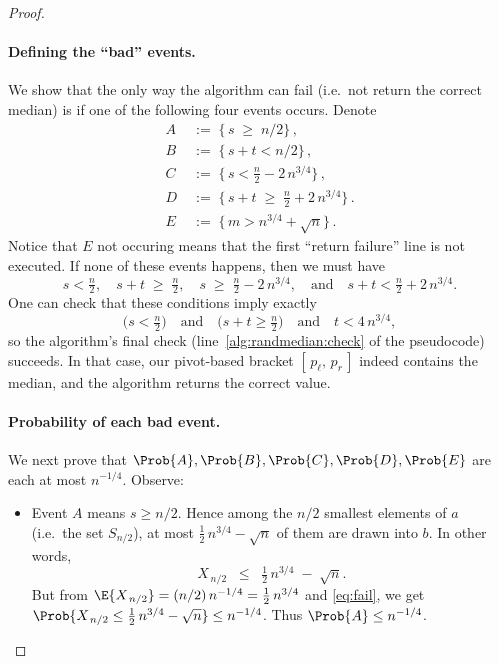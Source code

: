 \begin{proof}
    \paragraph{Defining the “bad” events.}
    We show that the only way the algorithm can fail (i.e.\ not return the correct median) is if one of the following four events occurs. Denote
    \begin{align*}
    A \;&:=\; \{\, s \;\ge\; n/2 \}\,,
    \\
    B \;&:=\; \{\, s + t < n/2 \}\,,
    \\
    C \;&:=\; \{\, s < \tfrac{n}{2} - 2\,n^{3/4} \}\,,
    \\
    D \;&:=\; \{\, s + t \;\ge\; \tfrac{n}{2} + 2\,n^{3/4} \}\,.
    \\
    E \;&:=\; \{\, m > n^{3/4} + \sqrt{n} \}\,.
    \end{align*}
    Notice that $E$ not occuring means that the first ``return failure'' line is not executed. If none of these events happens, then we must have
    \[
    s < \tfrac{n}{2}, 
    \quad
    s + t \;\ge\; \tfrac{n}{2},
    \quad
    s \;\ge\; \tfrac{n}{2} - 2\,n^{3/4},
    \quad
    \text{and}
    \quad
    s + t < \tfrac{n}{2} + 2\,n^{3/4}.
    \]
    One can check that these conditions imply exactly
    \[
    \bigl(s < \tfrac{n}{2}\bigr)
    \quad\text{and}\quad
    \bigl(s + t \ge \tfrac{n}{2}\bigr)
    \quad\text{and}\quad
    t < 4\,n^{3/4},
    \]
    so the algorithm’s final check (line~\ref{alg:randmedian:check} of the pseudocode) succeeds. In that case, our pivot-based bracket \([\,p_\ell,\,p_r\,]\) indeed contains the median, and the algorithm returns the correct value.
    
    \paragraph{Probability of each bad event.}
    We next prove that \(\Prob{A},\Prob{B},\Prob{C},\Prob{D},\Prob{E}\) are each at most \(n^{-1/4}\). Observe:
    \begin{itemize}
    \item Event \(A\) means \(s \ge n/2\). Hence among the \(n/2\) smallest elements of \(a\) (i.e.\ the set \(S_{n/2}\)), at most \(\tfrac12\,n^{3/4} - \sqrt{n}\) of them are drawn into \(b\). In other words,
    \[
    X_{\,n/2} \;\;\le\;\; \tfrac12\,n^{3/4} \;-\; \sqrt{n}.
    \]
    But from \(\E{X_{\,n/2}} = (n/2)\,n^{-1/4} = \tfrac12\,n^{3/4}\) and \eqref{eq:fail}, we get 
    \(\Prob{X_{\,n/2} \le \tfrac12\,n^{3/4} - \sqrt{n}} \le n^{-1/4}\). Thus \(\Prob{A} \le n^{-1/4}\).
    

\end{itemize}
\end{proof}
